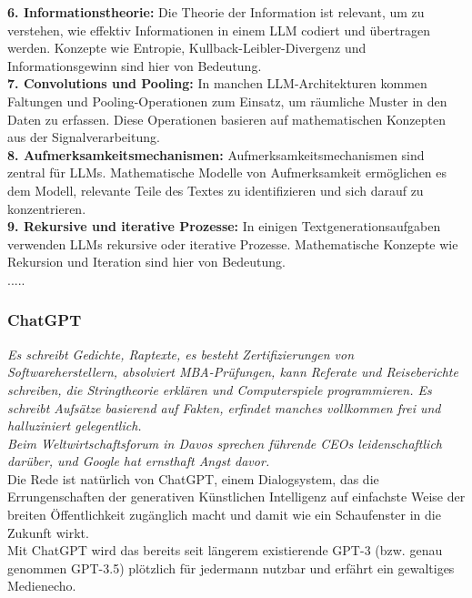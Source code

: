 \documentclass[12pt]{article}
\begin{document}
\textbf{6. Informationstheorie:} Die Theorie der Information ist relevant, um zu verstehen, wie effektiv Informationen in einem LLM codiert und übertragen werden. Konzepte wie Entropie, Kullback-Leibler-Divergenz und Informationsgewinn sind hier von Bedeutung.\\

\textbf{7. Convolutions und Pooling:} In manchen LLM-Architekturen kommen Faltungen und Pooling-Operationen zum Einsatz, um räumliche Muster in den Daten zu erfassen. Diese Operationen basieren auf mathematischen Konzepten aus der Signalverarbeitung.\\

\textbf{8. Aufmerksamkeitsmechanismen:} Aufmerksamkeitsmechanismen sind zentral für LLMs. Mathematische Modelle von Aufmerksamkeit ermöglichen es dem Modell, relevante Teile des Textes zu identifizieren und sich darauf zu konzentrieren.\\

\textbf{9. Rekursive und iterative Prozesse:} In einigen Textgenerationsaufgaben verwenden LLMs rekursive oder iterative Prozesse. Mathematische Konzepte wie Rekursion und Iteration sind hier von Bedeutung.\\

.....\\
\subsubsection{ChatGPT}

\textit{Es schreibt Gedichte, Raptexte, es besteht Zertifizierungen von Softwareherstellern, absolviert MBA-Prüfungen, kann Referate und Reiseberichte schreiben, die Stringtheorie erklären und Computerspiele programmieren. Es schreibt Aufsätze basierend auf Fakten, erfindet manches vollkommen frei und halluziniert gelegentlich. \\
Beim Weltwirtschaftsforum in Davos sprechen führende CEOs leidenschaftlich darüber, und Google hat ernsthaft Angst davor.}\\


Die Rede ist natürlich von ChatGPT, einem Dialogsystem, das die Errungenschaften der generativen Künstlichen Intelligenz auf einfachste Weise der breiten Öffentlichkeit zugänglich macht und damit wie ein Schaufenster in die Zukunft wirkt. \\
Mit ChatGPT wird das bereits seit längerem existierende GPT-3 (bzw.
genau genommen GPT-3.5) plötzlich für jedermann nutzbar und erfährt ein gewaltiges Medienecho.
\end{document}
